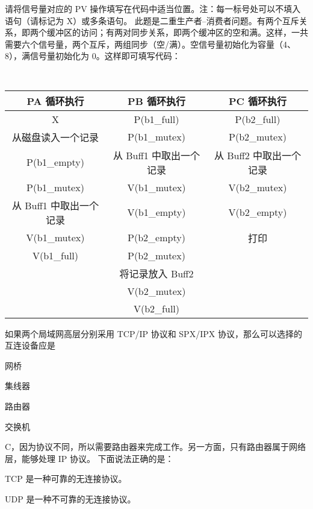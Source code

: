 \begin{problems}
            \qn 请将信号量对应的 PV 操作填写在代码中适当位置。注：每一标号处可以不填入语句（请标记为 X）或多条语句。
        \sol 此题是二重生产者{--}消费者问题。有两个互斥关系，即两个缓冲区的访问；有两对同步关系，即两个缓冲区的空和满。这样，一共需要六个信号量，两个互斥，两组同步（空/满）。空信号量初始化为容量（4、8），满信号量初始化为 0。这样即可填写代码：
        \begin{table}[H]
            \tt
            \centering
            \begin{tabular}{|c|c|c|}
                \hline
                PA 循环执行 & PB 循环执行 & PC 循环执行 \\ \hline
                X & P(b1\_full) & P(b2\_full) \\
                从磁盘读入一个记录 & P(b1\_mutex) & P(b2\_mutex) \\
                P(b1\_empty) & 从 Buff1 中取出一个记录 & 从 Buff2 中取出一个记录 \\
                P(b1\_mutex) & V(b1\_mutex) & V(b2\_mutex) \\
                从 Buff1 中取出一个记录 & V(b1\_empty) & V(b2\_empty) \\
                V(b1\_mutex) & P(b2\_empty) & 打印 \\
                V(b1\_full) & P(b2\_mutex) &  \\
                & 将记录放入 Buff2 &  \\
                & V(b2\_mutex) &  \\
                & V(b2\_full) &  \\ \hline
            \end{tabular}
        \end{table}
         如果两个局域网高层分别采用 TCP/IP 协议和 SPX/IPX 协议，那么可以选择的互连设备应是
        \begin{choices}
            \item 网桥
            \item 集线器
            \item 路由器
            \item 交换机
        \end{choices}
        \sol C，因为协议不同，所以需要路由器来完成工作。另一方面，只有路由器属于网络层，能够处理 IP 协议。
         下面说法正确的是：
        \begin{choices}
            \item TCP 是一种可靠的无连接协议。
            \item UDP 是一种不可靠的无连接协议。

\end{choices}
\end{problems}
